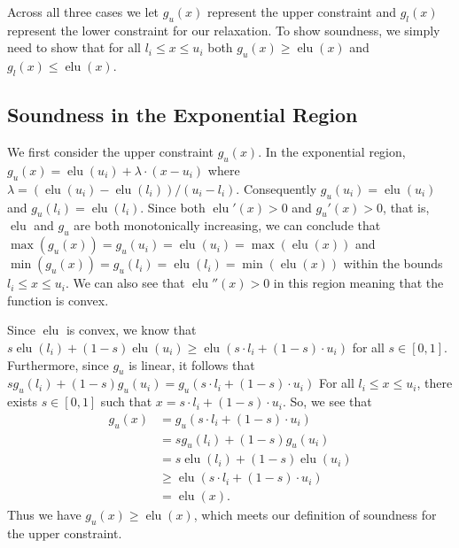 \documentclass{llncs}
\DeclareMathOperator{\elu}{elu}
\begin{document}
Across all three cases we let $g_u(x)$ represent the upper constraint and $g_l(x)$ represent the lower constraint for our relaxation.
To show soundness, we simply need to show that for all $l_i \leq x \leq u_i$ both $g_u(x) \geq \elu(x)$ and $g_l(x) \leq \elu(x)$.

\subsection{Soundness in the Exponential Region}
We first consider the upper constraint $g_u(x)$.
In the exponential region, $g_u(x) = \elu(u_i) + \lambda \cdot (x - u_i)$ where $\lambda = (\elu(u_i) - \elu(l_i)) / (u_i - l_i)$.
Consequently $g_u(u_i) = \elu(u_i)$ and $g_u(l_i) = \elu(l_i)$.
Since both $\elu'(x) > 0$ and $g_u'(x) > 0$, that is, $\elu$ and $g_u$ are both monotonically increasing, we can conclude that $\max(g_u(x)) = g_u(u_i) = \elu(u_i) = \max(\elu(x))$ and $\min(g_u(x)) = g_u(l_i) = \elu(l_i) = \min(\elu(x))$ within the bounds $l_i \leq x \leq u_i$.
We can also see that $\elu''(x) > 0$ in this region meaning that the function is convex.

Since $\elu$ is convex, we know that $s\elu(l_i) + (1-s)\elu(u_i) \geq \elu(s\cdot l_i + (1-s)\cdot u_i)$ for all $s\in [0, 1]$.
Furthermore, since $g_u$ is linear, it follows that $s g_u(l_i) + (1-s) g_u(u_i) = g_u(s\cdot l_i + (1-s)\cdot u_i)$
For all $l_i \leq x \leq u_i$, there exists $s\in[0,1]$ such that $x = s\cdot l_i + (1-s)\cdot u_i$.
So, we see that
\begin{align*} 
    g_u(x) &= g_u(s\cdot l_i + (1-s)\cdot u_i) \\
           &= s g_u(l_i) + (1-s) g_u(u_i) \\
           &= s \elu(l_i) + (1-s) \elu(u_i) \\
           &\geq \elu(s\cdot l_i + (1-s)\cdot u_i) \\
           &= \elu(x).
\end{align*}
Thus we have $g_u(x) \geq \elu(x)$, which meets our definition of soundness for the upper constraint.
\end{document}

